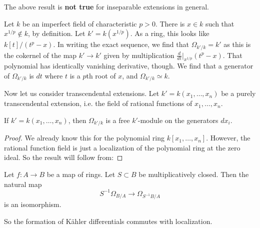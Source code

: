 \begin{remark} 
The above result is \textbf{not true} for inseparable extensions in general. 
\end{remark} 
\begin{example} 
Let $k$ be an imperfect field of characteristic $p>0$. There is $x \in k$ such
that $x^{1/p} \notin k$, by definition. Let $k' = k(x^{1/p})$. As a ring, this
looks like
$k[t]/(t^p - x)$. In writing the exact sequence, we find that $\Omega_{k'/k} =
k'$ as this is the cokernel of the map $k' \to k'$ given by multiplication
$\frac{d}{dt}|_{x^{1/p}} (t^p - x)$. That polynomial has identically vanishing
derivative, though. We find that a generator of $\Omega_{k'/k}$ is $dt$ where
$t$ is a $p$th root of $x$, and $\Omega_{k'/k } \simeq k$.
\end{example} 

Now let us consider transcendental extensions. Let $k' = k(x_1, \dots, x_n)$ be
a purely transcendental extension, i.e. the field of rational functions of
$x_1, \dots, x_n$.

\begin{proposition} 
If $k' = k(x_1, \dots, x_n)$, then $\Omega_{k'/k}$ is a free $k'$-module on the
generators $dx_i$.
\end{proposition} 
\begin{proof} 
We already know this for the polynomial ring $k[x_1, \dots, x_n]$. However, the
rational function field is just a localization of the polynomial ring at the
zero ideal.  So the result will follow from:
\end{proof} 

\begin{proposition} 
Let $f: A \to B$ be a map of rings. Let $S \subset  B$ be multiplicatively
closed. Then the natural map
\[ S^{-1}\Omega_{B/A} \to \Omega_{S^{-1}B/A}  \]
is an isomorphism.
\end{proposition} 
So the formation of K\"ahler differentials commutes with localization.

